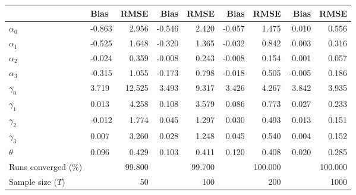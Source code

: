 
\begin{tabular}[t]{llrrrrrrr}
\toprule
  & Bias & RMSE & Bias & RMSE & Bias & RMSE & Bias & RMSE\\
\midrule
$\alpha_{0}$ & -0.863 & 2.956 & -0.546 & 2.420 & -0.057 & 1.475 & 0.010 & 0.556\\
$\alpha_{1}$ & -0.525 & 1.648 & -0.320 & 1.365 & -0.032 & 0.842 & 0.003 & 0.316\\
$\alpha_{2}$ & -0.024 & 0.359 & -0.008 & 0.243 & -0.008 & 0.154 & 0.001 & 0.057\\
$\alpha_{3}$ & -0.315 & 1.055 & -0.173 & 0.798 & -0.018 & 0.505 & -0.005 & 0.186\\
$\gamma_{0}$ & 3.719 & 12.525 & 3.493 & 9.317 & 3.426 & 4.267 & 3.842 & 3.935\\
$\gamma_{1}$ & 0.013 & 4.258 & 0.108 & 3.579 & 0.086 & 0.773 & 0.027 & 0.233\\
$\gamma_{2}$ & -0.012 & 1.774 & 0.045 & 1.297 & 0.030 & 0.493 & 0.013 & 0.151\\
$\gamma_{3}$ & 0.007 & 3.260 & 0.028 & 1.248 & 0.045 & 0.540 & 0.004 & 0.152\\
$\theta$ & 0.096 & 0.429 & 0.103 & 0.411 & 0.120 & 0.408 & 0.020 & 0.285\\
Runs converged (\%) &  & 99.800 &  & 99.700 &  & 100.000 &  & 100.000\\
Sample size ($T$) &  & 50 &  & 100 &  & 200 &  & 1000\\
\bottomrule
\end{tabular}

